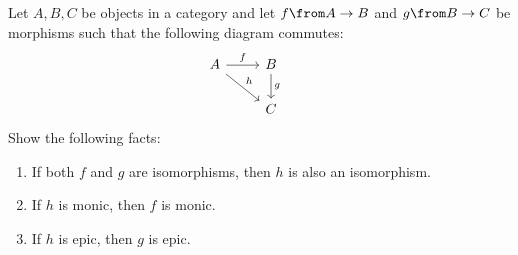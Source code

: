 \begin{exercise}
  Let $A, B, C$ be objects in a category and let $f \from A \to B$ and $g \from B \to C$ be morphisms such that the following diagram commutes:
  \[
    \begin{tikzcd}
      A \arrow{r}{f} \arrow{dr}{h} & B \arrow{d}{g} & \\
      & C &
    \end{tikzcd}
  \]
  Show the following facts:
  \begin{enumerate}
  \item If both $f$ and $g$ are isomorphisms, then $h$ is also an isomorphism.
  \item If $h$ is monic, then $f$ is monic.
  \item If $h$ is epic, then $g$ is epic.
  \end{enumerate}
\end{exercise}

